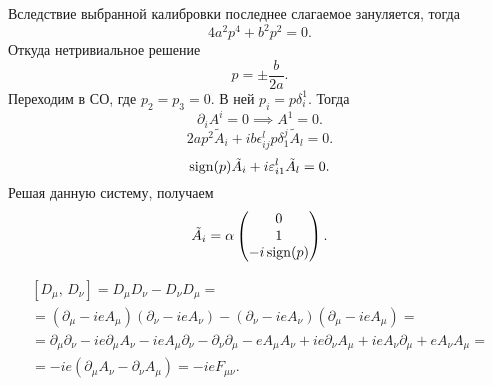 \documentclass[a4paper]{article}
\begin{document}
Вследствие выбранной калибровки последнее слагаемое зануляется, тогда
\[
4a^2 p^4+b^2 p^2=0
.\] 
Откуда нетривиальное решение 
\[
p= \pm\frac{b}{2a}
.\] 
Переходим в СО, где $p_2=p_3=0$. В ней $p_i =p\delta^1_i $.
Тогда
 \[
\partial_i A^i=0 \implies A^1=0
.\] 
\[
	2ap^2\tilde{A}_i+ib \epsilon^l_{ij}p\delta^j_1\tilde{A}_l=0
.\] 
\[
	\operatorname{\mathop{sign}}(p)	\tilde{A}_i+i\varepsilon^l_{i1}\tilde{A}_l=0
.\] 
Решая данную систему, получаем
\[
	\tilde{A}_i=\alpha \begin{pmatrix} 0\\1 \\ -i\operatorname{\mathop{sign}}(p) \end{pmatrix} 
.\] 
\begin{sol}
\begin{multline*}
\left[ D_\mu,\,D_\nu \right] =D_\mu D_\nu- D_\nu D_\mu=\\=
(\partial_\mu -i e A_\mu)(\partial_\nu- i e A_\nu)-
(\partial_\nu -i e A_\nu)(\partial_\mu-ie A_\mu)=\\=
\partial_\mu \partial_\nu-i e\partial_\mu A_\nu-
i e A_\mu \partial_\nu- \partial_\nu \partial_\mu
-eA_\mu A_\nu+
ie\partial_\nu A_\mu+ie A_\nu \partial_\mu+
e A_\nu A_\mu=\\=
-ie(\partial_\mu A_\nu-\partial_\nu A_\mu)=
-ie F_{\mu\nu}
.\end{multline*} 
\end{sol}
\end{document}
